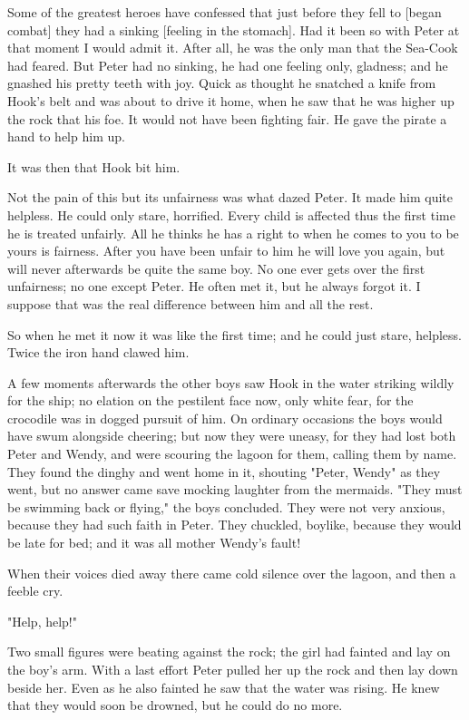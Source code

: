 Some of the greatest heroes have confessed that just before they fell to
[began combat] they had a sinking [feeling in the stomach]. Had it been so
with Peter at that moment I would admit it. After all, he was the only man
that the Sea-Cook had feared. But Peter had no sinking, he had one feeling
only, gladness; and he gnashed his pretty teeth with joy. Quick as thought
he snatched a knife from Hook's belt and was about to drive it home, when
he saw that he was higher up the rock that his foe. It would not have been
fighting fair. He gave the pirate a hand to help him up.


It was then that Hook bit him.


Not the pain of this but its unfairness was what dazed Peter. It made him
quite helpless. He could only stare, horrified. Every child is affected
thus the first time he is treated unfairly. All he thinks he has a right
to when he comes to you to be yours is fairness. After you have been
unfair to him he will love you again, but will never afterwards be quite
the same boy. No one ever gets over the first unfairness; no one except
Peter. He often met it, but he always forgot it. I suppose that was the
real difference between him and all the rest.


So when he met it now it was like the first time; and he could just stare,
helpless. Twice the iron hand clawed him.


A few moments afterwards the other boys saw Hook in the water striking
wildly for the ship; no elation on the pestilent face now, only white
fear, for the crocodile was in dogged pursuit of him. On ordinary
occasions the boys would have swum alongside cheering; but now they were
uneasy, for they had lost both Peter and Wendy, and were scouring the
lagoon for them, calling them by name. They found the dinghy and went home
in it, shouting "Peter, Wendy" as they went, but no answer came save
mocking laughter from the mermaids. "They must be swimming back or
flying," the boys concluded. They were not very anxious, because they had
such faith in Peter. They chuckled, boylike, because they would be late
for bed; and it was all mother Wendy's fault!


When their voices died away there came cold silence over the lagoon, and
then a feeble cry.


"Help, help!"


Two small figures were beating against the rock; the girl had fainted and
lay on the boy's arm. With a last effort Peter pulled her up the rock and
then lay down beside her. Even as he also fainted he saw that the water
was rising. He knew that they would soon be drowned, but he could do no
more.


